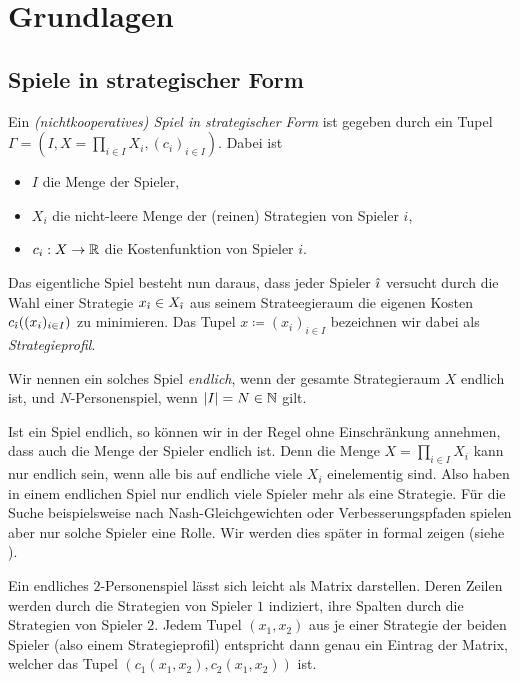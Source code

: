 \section{Grundlagen}\label{sec:Grundlagen}

\subsection{Spiele in strategischer Form}

\begin{defn}
	Ein \emph{(nichtkooperatives) Spiel in strategischer Form} ist gegeben durch ein Tupel $\Gamma = (I, X = \prod_{i\in I} X_i, (c_i)_{i\in I})$. Dabei ist
	\begin{itemize}
		\item $I$ die Menge der Spieler,
		\item $X_i$ die nicht-leere Menge der (reinen) Strategien von Spieler $i$,
		\item $c_i: X \to \mathbb{R}$ die Kostenfunktion von Spieler $i$.
	\end{itemize}
	Das eigentliche Spiel besteht nun daraus, dass jeder Spieler ${\hat{\imath}}$ versucht durch die Wahl einer Strategie $x_{\hat{\imath}} \in X_{\hat{\imath}}$ aus seinem Strateegieraum die eigenen Kosten $c_{\hat{\imath}}((x_i)_{i \in I})$ zu minimieren. Das Tupel $x \coloneqq (x_i)_{i \in I}$ bezeichnen wir dabei als \emph{Strategieprofil}.
	
	Wir nennen ein solches Spiel \emph{endlich}, wenn der gesamte Strategieraum $X$ endlich ist, und $N$-Personenspiel, wenn $\left|I\right| = N \in \mathbb{N}$ gilt.
\end{defn}

\begin{beob}\label{beob:endlicheSpiele}
	Ist ein Spiel endlich, so können wir in der Regel ohne Einschränkung annehmen, dass auch die Menge der Spieler endlich ist. Denn die Menge $X = \prod_{i\in I} X_i$ kann nur endlich sein, wenn alle bis auf endliche viele $X_i$ einelementig sind. Also haben in einem endlichen Spiel nur endlich viele Spieler mehr als eine Strategie. Für die Suche beispielsweise nach Nash-Gleichgewichten oder Verbesserungspfaden spielen aber nur solche Spieler eine Rolle. Wir werden dies später in  formal zeigen (siehe ).
\end{beob}

\begin{notation}
	Ein endliches $2$-Personenspiel lässt sich leicht als Matrix darstellen. Deren Zeilen werden durch die Strategien von Spieler $1$ indiziert, ihre Spalten durch die Strategien von Spieler $2$. Jedem Tupel $(x_1, x_2)$ aus je einer Strategie der beiden Spieler (also einem Strategieprofil) entspricht dann genau ein Eintrag der Matrix, welcher das Tupel $(c_1(x_1, x_2), c_2(x_1, x_2))$ ist.
\end{notation}

